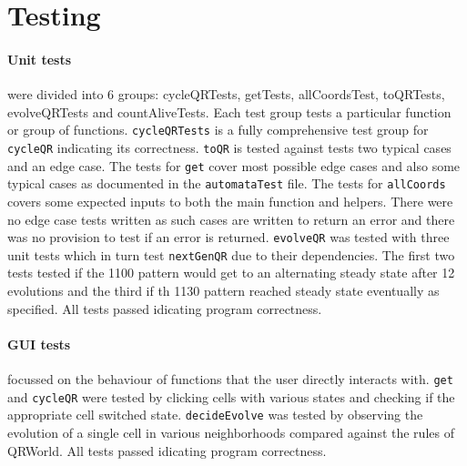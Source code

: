 \documentclass[11pt]{article}
\begin{document}
\section{Testing}%
\paragraph{Unit tests} were divided into 6 groups: cycleQRTests, getTests, allCoordsTest, toQRTests, evolveQRTests and countAliveTests. Each test group tests a particular function or group of functions. \verb|cycleQRTests| is a fully comprehensive test group for \verb|cycleQR| indicating its correctness. \verb|toQR| is tested against tests two typical cases and an edge case. The tests for \verb|get| cover most possible edge cases and also some typical cases as documented in the \verb|automataTest| file. The tests for \verb|allCoords| covers some expected inputs to both the main function and helpers. There were no edge case tests written as such cases are written to return an error and there was no provision to test if an error is returned. \verb|evolveQR| was tested with three unit tests which in turn test \verb|nextGenQR| due to their dependencies. The first two tests tested if the 1100 pattern would get to an alternating steady state after 12 evolutions and the third if th 1130 pattern reached steady state eventually as specified. All tests passed idicating program correctness.
\paragraph{GUI tests} focussed on the behaviour of functions that the user directly interacts with. \verb|get| and \verb|cycleQR| were tested by clicking cells with various states and checking if the appropriate cell switched state. \verb|decideEvolve| was tested by observing the evolution of a single cell in various neighborhoods compared against the rules of QRWorld. All tests passed idicating program correctness.
\end{document}
